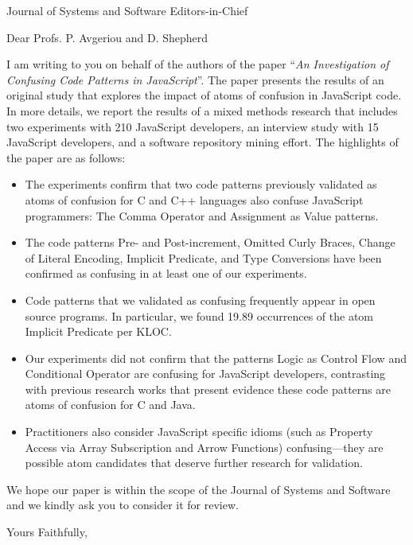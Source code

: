 \documentclass{letter}
\begin{document}
\begin{letter}{Journal of Systems and Software Editors-in-Chief}
  
\opening{Dear Profs. P. Avgeriou and D. Shepherd} 

I am writing to you on behalf of the authors of the
paper ``\emph{An Investigation of Confusing Code Patterns in JavaScript}''.
The paper presents the results of an original study that explores the impact of atoms of confusion in
JavaScript code. In more details, we report the results of a mixed methods research
that includes two experiments with 210 JavaScript developers, an interview
study with 15 JavaScript developers, and a software repository mining effort.
The highlights of the paper are as follows:

\begin{itemize}
 \item The experiments confirm that two code patterns previously validated as atoms of confusion for C and C++ languages
  also confuse JavaScript programmers: The Comma Operator and Assignment as Value patterns.

 \item The code patterns Pre- and Post-increment, Omitted Curly Braces, Change of Literal
   Encoding, Implicit Predicate, and Type Conversions have been confirmed as confusing in at least one of our experiments.

 \item Code patterns that we validated as confusing frequently appear in open source programs. In particular,
   we found 19.89 occurrences of the atom Implicit Predicate per KLOC.

 \item Our experiments did not confirm that the patterns Logic as Control Flow and Conditional Operator are confusing for
   JavaScript developers, contrasting with previous research works that present evidence these code patterns are atoms of confusion for C and Java.

 \item Practitioners also consider JavaScript specific idioms (such as Property Access via Array Subscription and Arrow Functions)
   confusing---they are possible atom candidates that deserve further research for validation. 
\end{itemize}


We hope our paper is within the scope of the Journal of Systems and Software and
we kindly ask you to consider it for review.


\closing{Yours Faithfully,}


\end{letter}
\end{document}
